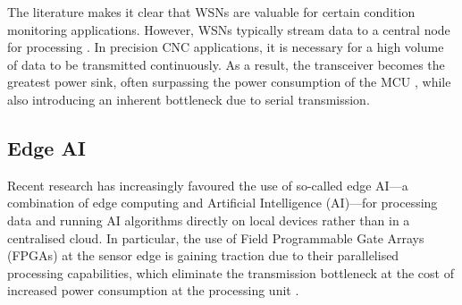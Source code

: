 \documentclass[../main.tex]{subfiles}
\begin{document}
The literature makes it clear that WSNs are valuable for certain condition monitoring applications. However, WSNs typically stream data to a central node for processing \cite{RN35}. In precision CNC applications, it is necessary for a high volume of data to be transmitted continuously. As a result, the transceiver becomes the greatest power sink, often surpassing the power consumption of the MCU \cite{RN36}, while also introducing an inherent bottleneck due to serial transmission. 


\subsection{Edge AI}

Recent research has increasingly favoured the use of so-called edge AI---a combination of edge computing and Artificial Intelligence (AI)---for processing data and running AI algorithms directly on local devices rather than in a centralised cloud. In particular, the use of Field Programmable Gate Arrays (FPGAs) at the sensor edge is gaining traction due to their parallelised processing capabilities, which eliminate the transmission bottleneck at the cost of increased power consumption at the processing unit \cite{RN37}.
\end{document}
